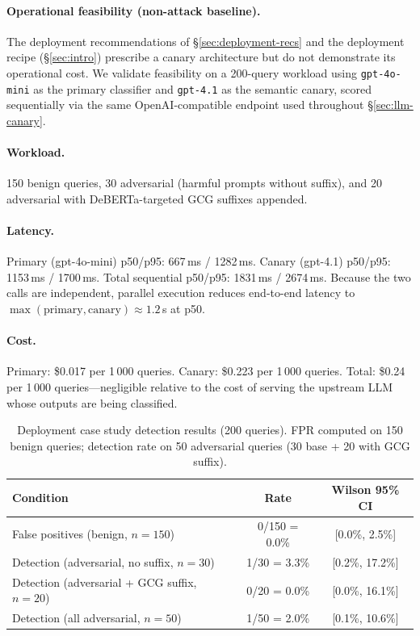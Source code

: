 \paragraph{Operational feasibility (non-attack baseline).} The deployment recommendations of \S\ref{sec:deployment-recs} and the deployment recipe (\S\ref{sec:intro}) prescribe a canary architecture but do not demonstrate its operational cost. We validate feasibility on a 200-query workload using \texttt{gpt-4o-mini} as the primary classifier and \texttt{gpt-4.1} as the semantic canary, scored sequentially via the same OpenAI-compatible endpoint used throughout \S\ref{sec:llm-canary}.

\paragraph{Workload.} 150 benign queries, 30 adversarial (harmful prompts without suffix), and 20 adversarial with DeBERTa-targeted GCG suffixes appended.

\paragraph{Latency.} Primary (gpt-4o-mini) p50/p95: 667\,ms / 1282\,ms. Canary (gpt-4.1) p50/p95: 1153\,ms / 1700\,ms. Total sequential p50/p95: 1831\,ms / 2674\,ms. Because the two calls are independent, parallel execution reduces end-to-end latency to $\max(\text{primary}, \text{canary}) \approx 1.2$\,s at p50.

\paragraph{Cost.} Primary: \$0.017 per 1\,000 queries. Canary: \$0.223 per 1\,000 queries. Total: \$0.24 per 1\,000 queries---negligible relative to the cost of serving the upstream LLM whose outputs are being classified.

\begin{table}[h]
\centering
\small
\caption{Deployment case study detection results (200 queries). FPR computed on 150 benign queries; detection rate on 50 adversarial queries (30 base + 20 with GCG suffix).}
\label{tab:deployment-case}
\begin{tabular}{lcc}
\toprule
\textbf{Condition} & \textbf{Rate} & \textbf{Wilson 95\% CI} \\
\midrule
False positives (benign, $n{=}150$) & 0/150 = 0.0\% & [0.0\%, 2.5\%] \\
Detection (adversarial, no suffix, $n{=}30$) & 1/30 = 3.3\% & [0.2\%, 17.2\%] \\
Detection (adversarial + GCG suffix, $n{=}20$) & 0/20 = 0.0\% & [0.0\%, 16.1\%] \\
Detection (all adversarial, $n{=}50$) & 1/50 = 2.0\% & [0.1\%, 10.6\%] \\
\bottomrule
\end{tabular}
\end{table}

